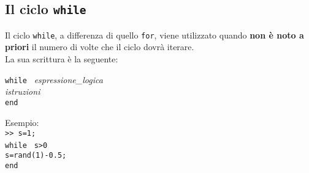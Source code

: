 \subsection{Il ciclo \texttt{while}}
Il ciclo \texttt{while}, a differenza di quello \texttt{for}, viene utilizzato quando \textbf{non è noto a priori} il 
numero di volte che il ciclo dovrà iterare. \\
La sua scrittura è la seguente:
\begin{center}
\texttt{while } \textit{espressione\_logica} \\ 
\hspace{1.5cm}\textit{istruzioni}  \\
\hspace{-4.1cm}\texttt{end}
\end{center}

Esempio: \\
\texttt{>> s=1;} \\
\texttt{while } \texttt{s>0} \\ 
\hspace{1cm}\texttt{s=rand(1)-0.5;}  \\
\texttt{end}
